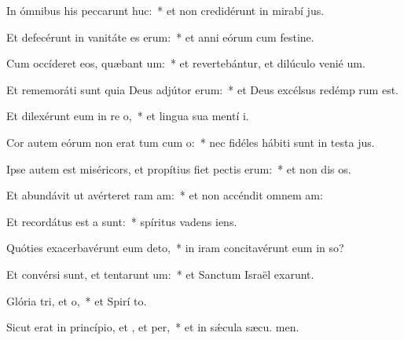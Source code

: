 \item In ómnibus his peccarunt huc:~* et non credidérunt in mirabí jus.
\item Et defecérunt in vanitáte es erum:~* et anni eórum cum festine.
\item Cum occíderet eos, quæbant um:~* et revertebántur, et dilúculo venié  um.
\item Et rememoráti sunt quia Deus adjútor  erum:~* et Deus excélsus redémp rum est.
\item Et dilexérunt eum in re o,~* et lingua sua mentí  i.
\item Cor autem eórum non erat tum cum o:~* nec fidéles hábiti sunt in testa jus.
\item Ipse autem est miséricors, et propítius fiet pectis erum:~* et non dis os.
\item Et abundávit ut avérteret ram am:~* et non accéndit omnem  am:
\item Et recordátus est a  sunt:~* spíritus vadens   iens.
\item Quóties exacerbavérunt eum  deto,~* in iram concitavérunt eum in so?
\item Et convérsi sunt, et tentarunt um:~* et Sanctum Israël exarunt.
\item Glória tri, et o,~* et Spirí to.
\item Sicut erat in princípio, et , et per,~* et in sǽcula sæcu. men.
